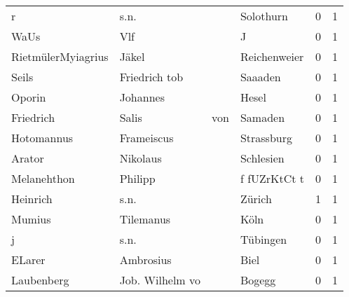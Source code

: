 \documentclass[10pt,a4paper,landscape]{article}
\begin{document}
\begin{longtable}{llllrr}
                        r &                               s.n. &             &                                   Solothurn &          0 &         1 \\
                     WaUs &                                Vlf &             &                                           J &          0 &         1 \\
       RietmülerMyiagrius &                              Jäkel &             &                                Reichenweier &          0 &         1 \\
                    Seils &                      Friedrich tob &             &                                     Saaaden &          0 &         1 \\
                   Oporin &                           Johannes &             &                                       Hesel &          0 &         1 \\
                Friedrich &                              Salis &         von &                                     Samaden &          0 &         1 \\
               Hotomannus &                         Frameiscus &             &                                  Strassburg &          0 &         1 \\
                   Arator &                           Nikolaus &             &                                   Schlesien &          0 &         1 \\
              Melanehthon &                            Philipp &             &                                f fUZrKtCt t &          0 &         1 \\
                 Heinrich &                               s.n. &             &                                      Zürich &          1 &         1 \\
                   Mumius &                          Tilemanus &             &                                        Köln &          0 &         1 \\
                        j &                               s.n. &             &                                    Tübingen &          0 &         1 \\
                   ELarer &                          Ambrosius &             &                                        Biel &          0 &         1 \\
               Laubenberg &                    Job. Wilhelm vo &             &                                      Bogegg &          0 &         1 \\

\end{longtable}
\end{document}
